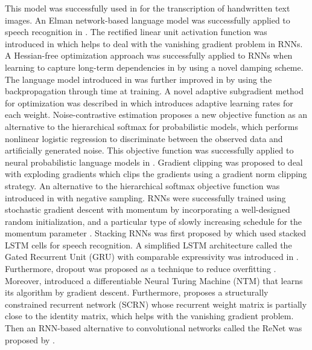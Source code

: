 \documentclass[draft,final]{vutinfth} %
\begin{document}
    This model was successfully used in \cite{offline_handwriting} for the transcription of handwritten text images.
    An Elman network-based language model was successfully applied to speech recognition in \cite{language_model_rnn}.
    The rectified linear unit activation function was introduced in \cite{relu} which helps to deal with the vanishing gradient problem in RNNs.
    A Hessian-free optimization approach \cite{hessian_free_optimization} was successfully applied to RNNs when learning to capture long-term dependencies in \cite{hessian_free_application} by using a novel damping scheme.
    The language model introduced in \cite{language_model_rnn} was further improved in \cite{bptt_lm} by using the backpropagation through time at training.
    A novel adaptive subgradient method for optimization was described in \cite{adagrad} which introduces adaptive learning rates for each weight.
    Noise-contrastive estimation \cite{NCE} proposes a new objective function as an alternative to the hierarchical softmax for probabilistic models, which performs nonlinear logistic regression to discriminate between the observed data and artificially generated noise.
    This objective function was successfully applied to neural probabilistic language models in \cite{NCE_Application}.
    Gradient clipping \cite{gradient_clipping} was proposed to deal with exploding gradients which clips the gradients using a gradient norm clipping strategy.
    An alternative to the hierarchical softmax objective function was introduced in \cite{negative_sampling} with negative sampling.
    RNNs were successfully trained using stochastic gradient descent with momentum by incorporating a well-designed random initialization, and a particular type of slowly increasing schedule for the momentum parameter \cite{sgd_momentum}.
    Stacking RNNs was first proposed by \cite{rnn_stack} which used stacked LSTM cells for speech recognition.
    A simplified LSTM architecture called the Gated Recurrent Unit (GRU) with comparable expressivity was introduced in \cite{GRU}.
    Furthermore, dropout was proposed as a technique to reduce overfitting \cite{dropout}.
    Moreover, \cite{NTM} introduced a differentiable Neural Turing Machine (NTM) that learns its algorithm by gradient descent.
    Furthermore, \cite{SCRN} proposes a structurally constrained recurrent network (SCRN) whose recurrent weight matrix is partially close to the identity matrix, which helps with the vanishing gradient problem.
    Then an RNN-based alternative to convolutional networks called the ReNet was proposed by \cite{renet}.
\end{document}
